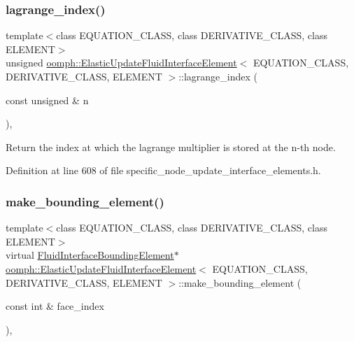 \subsubsection{\texorpdfstring{lagrange\+\_\+index()}{lagrange\_index()}}
{\footnotesize\ttfamily template$<$class E\+Q\+U\+A\+T\+I\+O\+N\+\_\+\+C\+L\+A\+SS, class D\+E\+R\+I\+V\+A\+T\+I\+V\+E\+\_\+\+C\+L\+A\+SS, class E\+L\+E\+M\+E\+NT$>$ \\
unsigned \hyperlink{classoomph_1_1ElasticUpdateFluidInterfaceElement}{oomph\+::\+Elastic\+Update\+Fluid\+Interface\+Element}$<$ E\+Q\+U\+A\+T\+I\+O\+N\+\_\+\+C\+L\+A\+SS, D\+E\+R\+I\+V\+A\+T\+I\+V\+E\+\_\+\+C\+L\+A\+SS, E\+L\+E\+M\+E\+NT $>$\+::lagrange\+\_\+index (\begin{DoxyParamCaption}\item[{const unsigned \&}]{n }\end{DoxyParamCaption})\hspace{0.3cm}{\ttfamily [inline]}, {\ttfamily [private]}}



Return the index at which the lagrange multiplier is stored at the n-\/th node. 



Definition at line 608 of file specific\+\_\+node\+\_\+update\+\_\+interface\+\_\+elements.\+h.

\mbox{\label{classoomph_1_1ElasticUpdateFluidInterfaceElement_a91c59905720a4417447fcce09032ce7f}} 
\subsubsection{\texorpdfstring{make\+\_\+bounding\+\_\+element()}{make\_bounding\_element()}}
{\footnotesize\ttfamily template$<$class E\+Q\+U\+A\+T\+I\+O\+N\+\_\+\+C\+L\+A\+SS, class D\+E\+R\+I\+V\+A\+T\+I\+V\+E\+\_\+\+C\+L\+A\+SS, class E\+L\+E\+M\+E\+NT$>$ \\
virtual \hyperlink{classoomph_1_1FluidInterfaceBoundingElement}{Fluid\+Interface\+Bounding\+Element}$\ast$ \hyperlink{classoomph_1_1ElasticUpdateFluidInterfaceElement}{oomph\+::\+Elastic\+Update\+Fluid\+Interface\+Element}$<$ E\+Q\+U\+A\+T\+I\+O\+N\+\_\+\+C\+L\+A\+SS, D\+E\+R\+I\+V\+A\+T\+I\+V\+E\+\_\+\+C\+L\+A\+SS, E\+L\+E\+M\+E\+NT $>$\+::make\+\_\+bounding\+\_\+element (\begin{DoxyParamCaption}\item[{const int \&}]{face\+\_\+index }\end{DoxyParamCaption})\hspace{0.3cm}{\ttfamily [inline]}, {\ttfamily [virtual]}}



